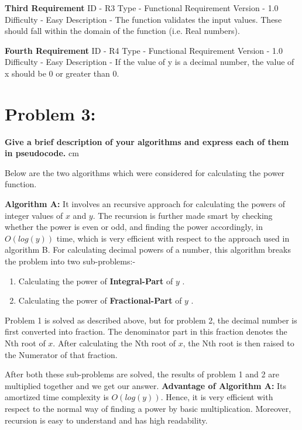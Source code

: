 \documentclass[12pt]{article}
\begin{document}
\textbf{Third Requirement}
\vskip 0.25cm
ID - R3
\vskip 0.25cm
Type - Functional Requirement
\vskip 0.25cm
Version - 1.0
\vskip 0.25cm
Difficulty - Easy
\vskip 0.25cm
Description - The function validates the input values. These should fall within the domain of the function (i.e. Real numbers).
\vskip 1cm

\textbf{Fourth Requirement}
\vskip 0.25cm
ID - R4
\vskip 0.25cm
Type - Functional Requirement
\vskip 0.25cm
Version - 1.0
\vskip 0.25cm
Difficulty - Easy
\vskip 0.25cm
Description - If the value of y is a decimal number, the value of x should be 0 or greater than 0.
\vskip 0.25cm


\section*{Problem 3:}
\textbf{Give a brief description of your algorithms and express each of them in pseudocode.} 
 cm

Below are the two algorithms which were considered for calculating the power function.

\textbf{Algorithm A:} It involves an recursive approach for calculating the powers of integer values of $x$ and $y$. The recursion is further made smart by checking whether the power is even or odd, and finding the power accordingly, in $O(log(y))$ time, which is very efficient with respect to the approach used in algorithm B.
For calculating decimal powers of a number, this algorithm breaks the problem into two sub-problems:-
\begin{enumerate}
    \item Calculating the power of \textbf{Integral-Part} of $y$  .
    \item Calculating the power of \textbf{Fractional-Part} of $y$  .
\end{enumerate}
Problem 1 is solved as described above, but for problem 2, the decimal number is first converted into fraction. The denominator part in this fraction denotes the Nth root of $x$. After calculating the Nth root of $x$, the Nth root is then raised to the Numerator of that fraction.

\vskip 0.25cm
After both these sub-problems are solved, the results of problem 1 and 2 are multiplied together and we get our answer.
\vskip 0.25cm
\textbf{Advantage of Algorithm A:}
\vskip 0.25cm
 Its amortized time complexity is $O(log(y))$. Hence, it is very efficient with respect to the normal way of finding a power by basic multiplication. Moreover, recursion is easy to understand and has high readability.
 
\end{document}
